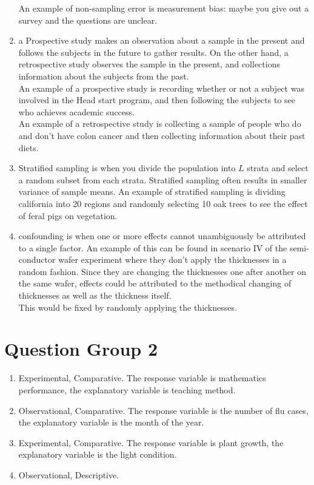 \documentclass{article}
\begin{document}
\begin{enumerate}
An example of non-sampling error is measurement bias: maybe you give out a survey and the questions are unclear. \\
\item a Prospective study makes an observation about a sample in the present and follows the subjects in the future to gather results. On the other hand, a retrospective study observes the sample in the present, and collections information about the subjects from the past. \\
An example of a prospective study is recording whether or not a subject was involved in the Head start program, and then following the subjects to see who achieves academic success. \\
An example of a retrospective study is collecting a sample of people who do and don't have colon cancer and then collecting information about their past diets. \\
\item Stratified sampling is when you divide the population into $L$ strata and select a random subset from each strata. Stratified sampling often results in smaller variance of sample means. An example of stratified sampling is dividing california into 20 regions and randomly selecting 10 oak trees to see the effect of feral pigs on vegetation. \\
\item confounding is when one or more effects cannot unambiguously be attributed to a single factor. An example of this can be found in scenario IV of the semi-conductor wafer experiment where they don't apply the thicknesses in a random fashion. Since they are changing the thicknesses one after another on the same wafer, effects could be attributed to the methodical changing of thicknesses as well as the thickness itself. \\
This would be fixed by randomly applying the thicknesses.\\
\end{enumerate}
\section*{Question Group 2}
\begin{enumerate}
\item Experimental, Comparative. The response variable is mathematics performance, the explanatory variable is teaching method. \\
\item Observational, Comparative. The response variable is the number of flu cases, the explanatory variable is the month of the year. \\
\item Experimental, Comparative. The response variable is plant growth, the explanatory variable is the light condition. \\
\item Observational, Descriptive.
\end{enumerate}
\end{document}
